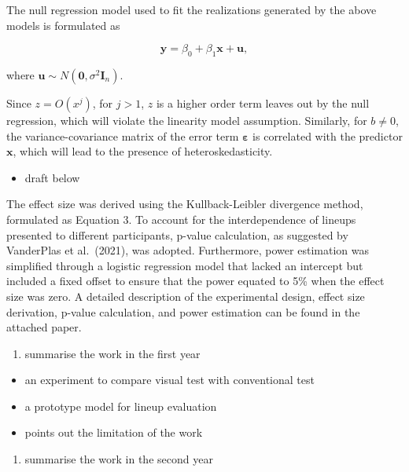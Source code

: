 \documentclass[11pt,a4paper,]{article}
\providecommand{\tightlist}{%
  \setlength{\itemsep}{0pt}\setlength{\parskip}{0pt}}
\begin{document}
The null regression model used to fit the realizations generated by the above models is formulated as

\begin{equation} \label{eq:null-model}
\boldsymbol{y} = \beta_0 + \beta_1 \boldsymbol{x} + \boldsymbol{u},
\end{equation}

\noindent where \(\boldsymbol{u} \sim N(\boldsymbol{0}, \sigma^2\boldsymbol{I}_n)\).

Since \(z = O(x^j)\), for \(j > 1\), \(z\) is a higher order term leaves out by the null regression, which will violate the linearity model assumption. Similarly, for \(b \neq 0\), the variance-covariance matrix of the error term \(\boldsymbol{\varepsilon}\) is correlated with the predictor \(\boldsymbol{x}\), which will lead to the presence of heteroskedasticity.

\begin{itemize}
\tightlist
\item
  draft below
\end{itemize}

The effect size was derived using the Kullback-Leibler divergence method, formulated as Equation 3. To account for the interdependence of lineups presented to different participants, p-value calculation, as suggested by VanderPlas et al.~(2021), was adopted. Furthermore, power estimation was simplified through a logistic regression model that lacked an intercept but included a fixed offset to ensure that the power equated to 5\% when the effect size was zero. A detailed description of the experimental design, effect size derivation, p-value calculation, and power estimation can be found in the attached paper.

\begin{enumerate}
\def\labelenumi{\arabic{enumi}.}
\setcounter{enumi}{2}
\tightlist
\item
  summarise the work in the first year
\end{enumerate}

\begin{itemize}
\tightlist
\item
  an experiment to compare visual test with conventional test
\item
  a prototype model for lineup evaluation
\item
  points out the limitation of the work
\end{itemize}

\begin{enumerate}
\def\labelenumi{\arabic{enumi}.}
\setcounter{enumi}{3}
\tightlist
\item
  summarise the work in the second year
\end{enumerate}
\end{document}
